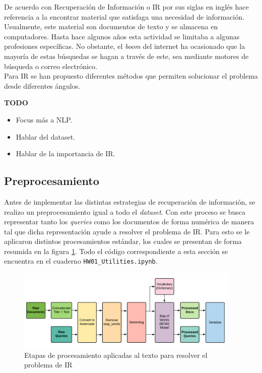 De acuerdo con \cite{IR-book} Recuperación de Información o IR por sus siglas en inglés hace referencia a la encontrar material que satisfaga una necesidad de información. Usualmente, este material son documentos de texto y se almacena en computadores. Hasta hace algunos años esta actividad se limitaba a algunas profesiones específicas. No obstante, el \textit{boom} del internet ha ocasionado que la mayoría de estas búsquedas se hagan a través de este, sea mediante motores de búsqueda o correo electrónico.\\

Para IR se han propuesto diferentes métodos que permiten solucionar el problema desde diferentes ángulos.

\textbf{TODO}
\begin{itemize}
    \item Focus más a NLP.
    \item Hablar del dataset.
    \item Hablar de la importancia de IR.
\end{itemize}

\subsection*{Preprocesamiento}

Antes de implementar las distintas estrategias de recuperación de información, se realizo un preprocesamiento igual a todo el \textit{dataset}. Con este proceso se busca representar tanto los \textit{queries} como los documentos de forma numérica de manera tal que dicha representación ayude a resolver el problema de IR. Para esto se le aplicaron distintos procesamientos estándar, los cuales se presentan de forma resumida en la figura \ref{fig:preprocess}. Todo el código correspondiente a esta sección se encuentra en el cuaderno \texttt{HW01\_Utilities.ipynb}.

\begin{figure}[H]
    \centering
    \includegraphics[width=0.95\textwidth]{doc/images/preprocesamiento.png}
    \caption{Etapas de procesamiento aplicadas al texto para resolver el problema de IR}
    \label{fig:preprocess}
\end{figure}

